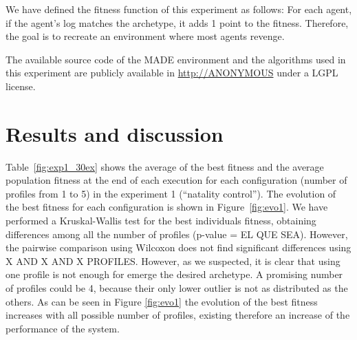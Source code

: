 \documentclass[runningheads]{llncs}
\begin{document}
We have defined the fitness function of this experiment as follows:
For each agent, if the agent's log matches the archetype, it adds 1 point to the fitness. Therefore, the goal is to recreate an environment where most agents revenge.

The available source code of the MADE environment and the algorithms used in this experiment are publicly available in \url{http://ANONYMOUS} under a LGPL license. %

\section{Results and discussion}
\label{sec:results}

Table~\ref{fig:exp1_30ex} shows the average of the best fitness and the average population fitness at the end of each execution for each configuration (number of profiles from 1 to 5) in the experiment 1 (``natality control'').
The evolution of the best fitness for each configuration is shown in Figure~\ref{fig:evo1}. We have performed a Kruskal-Wallis test for the best individuals fitness, obtaining differences among all the number of profiles (p-value = EL QUE SEA). However, the pairwise comparison using Wilcoxon does not find significant differences using X AND X AND X PROFILES. However, as we suspected, it is clear that using one profile is not enough for emerge the desired archetype. A promising number of profiles could be 4, because their only lower outlier is not as distributed as the others. As can be seen in Figure \ref{fig:evo1} the evolution of the best fitness increases with all possible number of profiles, existing therefore an increase of the performance of the system. %
\end{document}

